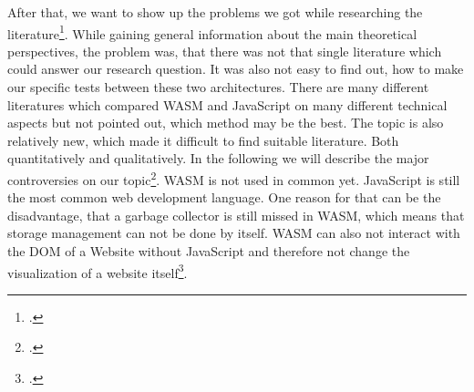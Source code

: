 After that, we want to show up the problems we got while researching the literature\footcite[p.37]{adams_research_2014}. While gaining general information about the main theoretical perspectives, the problem was, that there was not that single literature which could answer our research question. It was also not easy to find out, how to make our specific tests between these two architectures. There are many different literatures which compared WASM and JavaScript on many different technical aspects but not pointed out, which method may be the best. The topic is also relatively new, which made it difficult to find suitable literature. Both quantitatively and qualitatively.
In the following we will describe the major controversies on our topic\footcite[pp.37]{adams_research_2014}. WASM is not used in common yet. JavaScript is still the most common web development language. One reason for that can be the disadvantage, that a garbage collector is still missed in WASM, which means that storage management can not be done by itself. WASM can also not interact with the DOM of a Website without JavaScript and therefore not change the visualization of a website itself\footcite{bigelow_was_nodate}.
